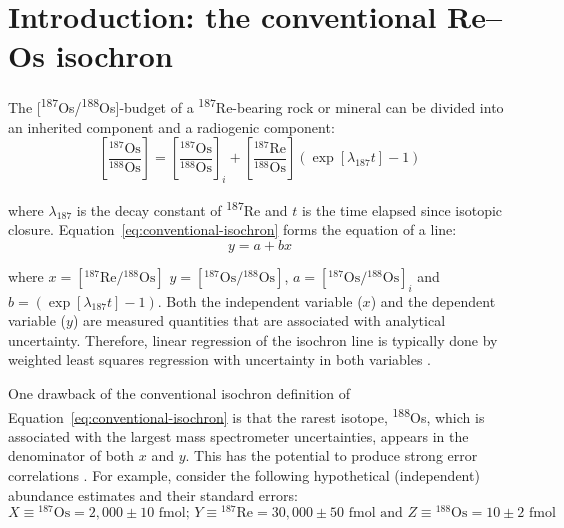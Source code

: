 \documentclass[]{article}
\begin{document}

\section{Introduction: the conventional Re--Os isochron}  %
\label{sec:intro}

The [\textsuperscript{187}Os/\textsuperscript{188}Os]-budget of a
\textsuperscript{187}Re-bearing rock or mineral can be divided into an
inherited component and a radiogenic component:
\begin{equation}
  \left[\frac{{}^{187}\mbox{Os}}{{}^{188}\mbox{Os}}\right] =
  \left[\frac{{}^{187}\mbox{Os}}{{}^{188}\mbox{Os}}\right]_{i} +
  \left[\frac{{}^{187}\mbox{Re}}{{}^{188}\mbox{Os}}\right]
  \left(\exp[\lambda_{187}t]-1\right)
  \label{eq:conventional-isochron}
\end{equation}

\noindent where $\lambda_{187}$ is the decay constant of
\textsuperscript{187}Re \citep[$= 1.666 \pm
  0.017~\mbox{yr}^{-11}$,][]{smoliar1996} and $t$ is the time elapsed
since isotopic closure. Equation~\ref{eq:conventional-isochron} forms
the equation of a line:
\begin{equation}
  y = a + b x
  \label{eq:y=a+bx}
\end{equation}

\noindent where $x =
\left[{{}^{187}\mbox{Re}}/{{}^{188}\mbox{Os}}\right]$ $y =
\left[{{}^{187}\mbox{Os}}/{{}^{188}\mbox{Os}}\right]$, $a =
\left[{{}^{187}\mbox{Os}}/{{}^{188}\mbox{Os}}\right]_i$ and $b =
\left(\exp[\lambda_{187}t]-1\right)$.  Both the independent variable
($x$) and the dependent variable ($y$) are measured quantities that
are associated with analytical uncertainty. Therefore, linear
regression of the isochron line is typically done by weighted least
squares regression with uncertainty in both variables
\citep{york2004}.

One drawback of the conventional isochron definition of
Equation~\ref{eq:conventional-isochron} is that the rarest isotope,
\textsuperscript{188}Os, which is associated with the largest mass
spectrometer uncertainties, appears in the denominator of both $x$ and
$y$. This has the potential to produce strong error correlations
\citep{stein2000}. For example, consider the following hypothetical
(independent) abundance estimates and their standard errors:
\[
X \equiv {}^{187}\mbox{Os} = 2,000 \pm 10 \mbox{~fmol;~}
Y \equiv {}^{187}\mbox{Re} = 30,000 \pm 50 \mbox{~fmol}
\mbox{~and~}
Z \equiv {}^{188}\mbox{Os} = 10 \pm 2 \mbox{~fmol}
\]
\end{document}
